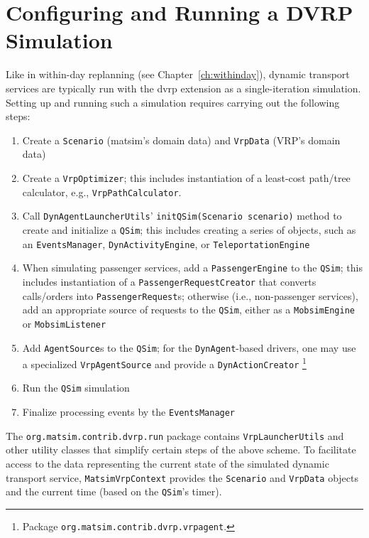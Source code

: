 \section{Configuring and Running a DVRP Simulation}
\label{sec:dvrp_config}
Like in within-day replanning (see Chapter~\ref{ch:withinday}), dynamic transport services are typically run with the \gls{dvrp} extension as a single-iteration simulation. Setting up and running such a simulation requires carrying out the following steps:
%
\begin{enumerate}
	\item Create a \lstinline$Scenario$ (\gls{matsim}'s domain data) and \lstinline$VrpData$ (VRP's domain data)	
	\item Create a \lstinline$VrpOptimizer$; this includes instantiation of a least-cost path/tree calculator, e.g., \lstinline$VrpPathCalculator$.
	\item Call \lstinline$DynAgentLauncherUtils$' \lstinline$initQSim(Scenario scenario)$ method to create and initialize a \lstinline$QSim$; this includes creating a series of objects, such as an \lstinline$EventsManager$, \lstinline$DynActivityEngine$, or \lstinline$TeleportationEngine$
	
	\item When simulating passenger services, add a \lstinline$PassengerEngine$ to the \lstinline$QSim$; this includes instantiation of a \lstinline$PassengerRequestCreator$ that converts calls/orders into \lstinline$PassengerRequest$s; otherwise (i.e., non-passenger services), add an appropriate source of requests to the \lstinline$QSim$, either as a \lstinline$MobsimEngine$ or \lstinline$MobsimListener$
	
	\item Add \lstinline$AgentSource$s to the \lstinline$QSim$; for the \lstinline$DynAgent$-based drivers, one may use a specialized \lstinline$VrpAgentSource$ and provide a \lstinline$DynActionCreator$%
	\footnote{
	Package \lstinline$org.matsim.contrib.dvrp.vrpagent$.
	}
	\item Run the \lstinline$QSim$ simulation
	\item Finalize processing events by the \lstinline$EventsManager$
\end{enumerate}

The \lstinline$org.matsim.contrib.dvrp.run$ package contains \lstinline$VrpLauncherUtils$ and other utility classes that simplify certain steps of the above scheme. To facilitate access to the data representing the current state of the simulated dynamic transport service, \lstinline$MatsimVrpContext$ provides the \lstinline$Scenario$ and \lstinline$VrpData$ objects and the current time (based on the \lstinline$QSim$'s timer).

